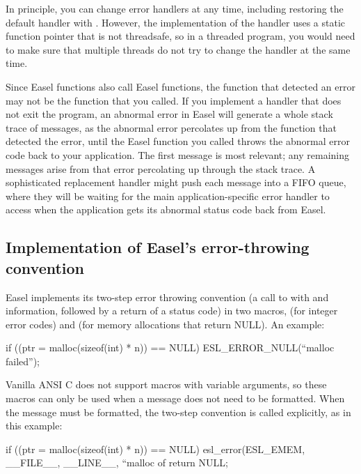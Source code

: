 \documentclass[11pt]{article}
\begin{document}
In principle, you can change error handlers at any time, including
restoring the default handler with
. However, the implementation
of the handler uses a static function pointer that is not threadsafe,
so in a threaded program, you would need to make sure that multiple
threads do not try to change the handler at the same time.

Since Easel functions also call Easel functions, the function that
detected an error may not be the function that you called.  If you
implement a handler that does not exit the program, an abnormal error
in Easel will generate a whole stack trace of 
messages, as the abnormal error percolates up from the function that
detected the error, until the Easel function you called throws the
abnormal error code back to your application. The first
 message is most relevant; any remaining messages
arise from that error percolating up through the stack trace.  A
sophisticated replacement  handler might push each
 message into a FIFO queue, where they will be
waiting for the main application-specific error handler to access when
the application gets its abnormal status code back from Easel.

\subsection{Implementation of Easel's error-throwing convention}

Easel implements its two-step error throwing convention (a call to
 with  and 
information, followed by a return of a status code) in two macros,
 (for integer error codes) and
 (for memory allocations that return
NULL). An example:

\begin{cchunk}
if ((ptr = malloc(sizeof(int) * n)) == NULL) ESL_ERROR_NULL(``malloc failed'');
\end{cchunk}

Vanilla ANSI C does not support macros with variable arguments, so
these macros can only be used when a message does not need to be
formatted. When the message must be formatted, the two-step convention
is called explicitly, as in this example:

\begin{cchunk}
if ((ptr = malloc(sizeof(int) * n)) == NULL)
  {
     esl_error(ESL_EMEM, __FILE__, __LINE__, ``malloc of %
     return NULL;
  }
\end{cchunk}
\end{document}
